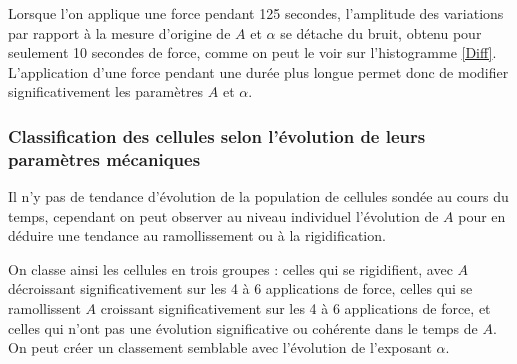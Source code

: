 Lorsque l'on applique une force pendant 125 secondes, l'amplitude des variations par rapport à la mesure d'origine de $A$ et $\alpha$ se détache du bruit, obtenu pour seulement 10 secondes de force, comme on peut le voir sur l'histogramme \ref{Diff}. L'application d'une force pendant une durée plus longue permet donc de modifier significativement les paramètres $A$ et $\alpha$. 

\subsubsection{Classification des cellules selon l'évolution de leurs paramètres mécaniques}

Il n'y pas de tendance d'évolution de la population de cellules sondée au cours du temps, cependant on peut observer au niveau individuel l'évolution de $A$ pour en déduire une tendance au ramollissement ou à la rigidification. 

On classe ainsi les cellules en trois groupes : celles qui se rigidifient, avec $A$ décroissant significativement sur les 4 à 6 applications de force, celles qui se ramollissent $A$ croissant significativement sur les 4 à 6 applications de force, et celles qui n'ont pas une évolution significative ou cohérente dans le temps de $A$. 
On peut créer un classement semblable avec l'évolution de l'exposant $\alpha$. 

